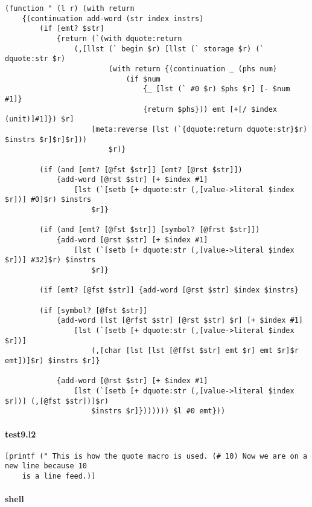 \documentclass[]{article}
\let\oldparagraph\paragraph
\renewcommand{\paragraph}[1]{\oldparagraph{#1}\mbox{}}
\begin{document}
\begin{verbatim}
(function " (l r) (with return
    {(continuation add-word (str index instrs)
        (if [emt? $str]
            {return (`(with dquote:return
                (,[llst (` begin $r) [llst (` storage $r) (` dquote:str $r)
                        (with return {(continuation _ (phs num)
                            (if $num
                                {_ [lst (` #0 $r) $phs $r] [- $num #1]}
                                {return $phs})) emt [+[/ $index (unit)]#1]}) $r]
                    [meta:reverse [lst (`{dquote:return dquote:str}$r) $instrs $r]$r]$r]))
                        $r)}
        
        (if (and [emt? [@fst $str]] [emt? [@rst $str]])
            {add-word [@rst $str] [+ $index #1]
                [lst (`[setb [+ dquote:str (,[value->literal $index $r])] #0]$r) $instrs
                    $r]}
                
        (if (and [emt? [@fst $str]] [symbol? [@frst $str]])
            {add-word [@rst $str] [+ $index #1]
                [lst (`[setb [+ dquote:str (,[value->literal $index $r])] #32]$r) $instrs
                    $r]}
        
        (if [emt? [@fst $str]] {add-word [@rst $str] $index $instrs}
                
        (if [symbol? [@fst $str]]
            {add-word [lst [@rfst $str] [@rst $str] $r] [+ $index #1]
                [lst (`[setb [+ dquote:str (,[value->literal $index $r])]
                    (,[char [lst [lst [@ffst $str] emt $r] emt $r]$r emt])]$r) $instrs $r]}
            
            {add-word [@rst $str] [+ $index #1]
                [lst (`[setb [+ dquote:str (,[value->literal $index $r])] (,[@fst $str])]$r)
                    $instrs $r]})))))) $l #0 emt}))
\end{verbatim}

\hypertarget{test9.l2}{%
\paragraph{test9.l2}\label{test9.l2}}

\begin{verbatim}
[printf (" This is how the quote macro is used. (# 10) Now we are on a new line because 10
    is a line feed.)]
\end{verbatim}

\hypertarget{shell-8}{%
\paragraph{shell}\label{shell-8}}
\end{document}
